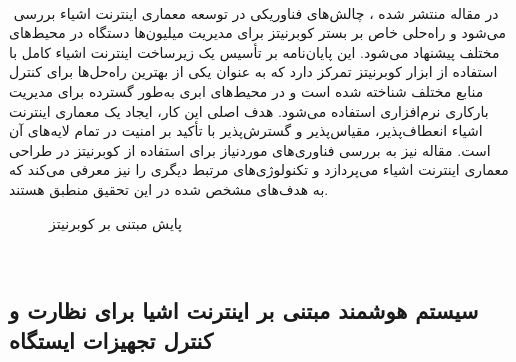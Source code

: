 \paragraph{}{‍
    در مقاله منتشر شده \cite{Mlynka2022thesis}، چالش‌های فناوریکی در توسعه معماری اینترنت اشیاء بررسی می‌شود و راه‌حلی خاص بر بستر کوبرنیتز برای مدیریت میلیون‌ها دستگاه در محیط‌های مختلف پیشنهاد می‌شود. این پایان‌نامه بر تأسیس یک زیرساخت اینترنت اشیاء کامل با استفاده از ابزار کوبرنیتز تمرکز دارد که به عنوان یکی از بهترین راه‌حل‌ها برای کنترل منابع مختلف شناخته شده است و در محیط‌های ابری به‌طور گسترده برای مدیریت بارکاری نرم‌افزاری استفاده می‌شود. هدف اصلی این کار، ایجاد یک معماری اینترنت اشیاء انعطاف‌پذیر، مقیاس‌پذیر و گسترش‌پذیر با تأکید بر امنیت در تمام لایه‌های آن است. مقاله نیز به بررسی فناوری‌های موردنیاز برای استفاده از کوبرنیتز در طراحی معماری اینترنت اشیاء می‌پردازد و تکنولوژی‌های مرتبط دیگری را نیز معرفی می‌کند که به هدف‌های مشخص شده در این تحقیق منطبق هستند.
    \begin{figure}[H]
        \caption{پایش مبتنی بر کوبرنیتز \cite{Mlynka2022thesis}}
        \label{fig:iot_monitoring}
    \end{figure}
‍}



\subsection{
    سیستم هوشمند مبتنی بر اینترنت اشیا برای نظارت و کنترل تجهیزات ایستگاه
}
\label{subsec:iot_controlling_sub_stations}
